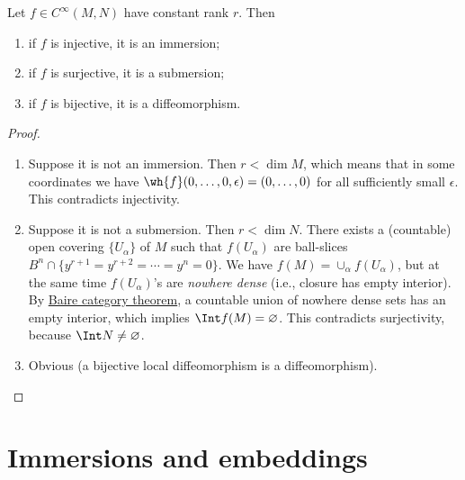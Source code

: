 \begin{thm}\label{Global rank}
Let $f\in C^\infty(M,N)$ have constant rank $r$. Then
\begin{enumerate}
    \item if $f$ is injective, it is an immersion;
    \item if $f$ is surjective, it is a submersion;
    \item if $f$ is bijective, it is a diffeomorphism.
\end{enumerate}
\end{thm}
\begin{proof}
\begin{enumerate}
    \item Suppose it is not an immersion. Then $r<\dim M$, which means that in some coordinates we have $\wh{f}(0,\ldots,0,\epsilon)=(0,\ldots,0)$ for all sufficiently small $\epsilon$. This contradicts injectivity.
    \item Suppose it is not a submersion. Then $r<\dim N$. There exists a (countable) open covering  $\{U_\alpha\}$ of $M$ such that $f(U_\alpha)$ are ball-slices $B^n\cap \{y^{r+1}=y^{r+2}=\cdots=y^n=0\}$. We have $f(M)=\cup_\alpha f(U_\alpha)$, but at the same time $f(U_\alpha)$'s are \emph{nowhere dense} (i.e., closure has empty interior). By \href{https://en.wikipedia.org/wiki/Baire_category_theorem}{Baire category theorem}, a countable union of nowhere dense sets has an empty interior, which implies $\Int  f(M)=\varnothing$. This contradicts surjectivity, because $\Int  N\neq\varnothing$.
    \item Obvious (a bijective local diffeomorphism is a diffeomorphism).
\end{enumerate}
\end{proof}



\section{Immersions and embeddings}

